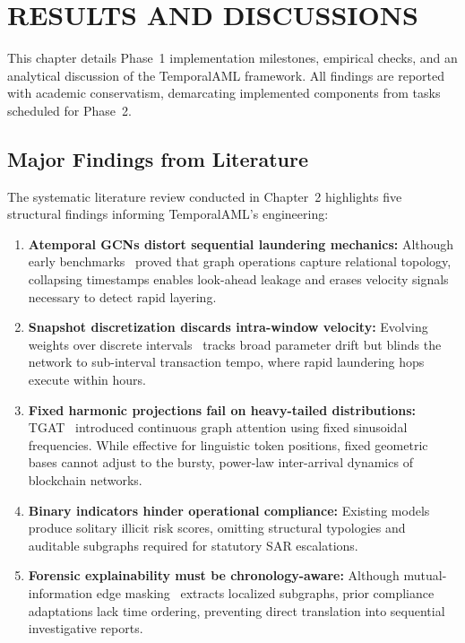 \chapter{RESULTS AND DISCUSSIONS}
\label{ChapterResults}

This chapter details Phase~1 implementation milestones, empirical checks, and an analytical discussion of the TemporalAML framework. All findings are reported with academic conservatism, demarcating implemented components from tasks scheduled for Phase~2.


\section{Major Findings from Literature}
\label{sec:major_findings}

The systematic literature review conducted in Chapter~2 highlights five structural findings informing TemporalAML's engineering:

\begin{enumerate}
    \item \textbf{Atemporal GCNs distort sequential laundering mechanics:} Although early benchmarks~\cite{weber2019anti} proved that graph operations capture relational topology, collapsing timestamps enables look-ahead leakage and erases velocity signals necessary to detect rapid layering.

    \item \textbf{Snapshot discretization discards intra-window velocity:} Evolving weights over discrete intervals~\cite{pareja2020evolvegcn} tracks broad parameter drift but blinds the network to sub-interval transaction tempo, where rapid laundering hops execute within hours.

    \item \textbf{Fixed harmonic projections fail on heavy-tailed distributions:} TGAT~\cite{xu2020tgat} introduced continuous graph attention using fixed sinusoidal frequencies. While effective for linguistic token positions, fixed geometric bases cannot adjust to the bursty, power-law inter-arrival dynamics of blockchain networks.

    \item \textbf{Binary indicators hinder operational compliance:} Existing models produce solitary illicit risk scores, omitting structural typologies and auditable subgraphs required for statutory SAR escalations.

    \item \textbf{Forensic explainability must be chronology-aware:} Although mutual-information edge masking~\cite{ying2019gnnexplainer} extracts localized subgraphs, prior compliance adaptations lack time ordering, preventing direct translation into sequential investigative reports.
\end{enumerate}

